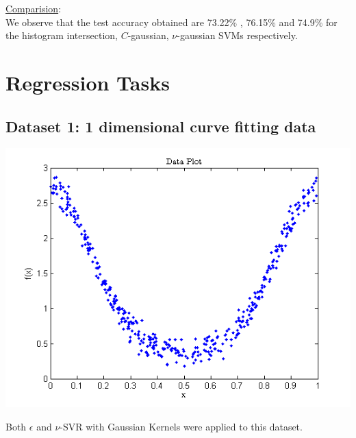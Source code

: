 \documentclass{article}
\begin{document}
\underline{Comparision}:\\
We observe that the test accuracy obtained are 73.22\% , 76.15\% and 74.9\% for the histogram intersection, $C$-gaussian, $\nu$-gaussian SVMs respectively. 
















\section{Regression Tasks}

\subsection{Dataset 1: 1 dimensional curve fitting data}
\begin{center}
\includegraphics[scale=1]{Regression/univar}
\end{center}
Both $\epsilon$ and $\nu$-SVR with Gaussian Kernels were applied to this dataset.
\end{document}
